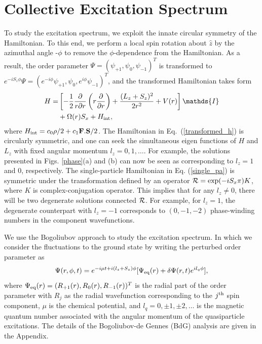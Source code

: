 \documentclass[pra,twocolumn,aps,superscriptaddress,showpacs,longbibliography]{revtex4-1}
\begin{document}
\section{Collective Excitation Spectrum}
\label{Sec-IV}
To study the excitation spectrum, we exploit the innate circular symmetry of the Hamiltonian. To this end, 
we perform a local spin rotation about $\hat{z}$ by the azimuthal angle -$\phi$ to remove the $\phi$-dependence from
the Hamiltonian. As a result, the order parameter $\Psi = (\psi_{+1}, \psi_0, \psi_{-1})^T$ is transformed to 
$e^{-i S_z\phi}{\Psi} =(e^{-i\phi}\psi_{+1}, \psi_0, e^{i\phi} \psi_{-1})^T$, and the transformed Hamiltonian
takes form
\begin{align}
\label{transformed_h}
{H} =& \left[-\frac{1}{2}\frac{\partial}{r \partial r}\left(r\frac{\partial}{\partial r}\right)+\frac{(L_z+S_z)^2}{2 r^2}+ V(r)\right]\mathds{I}\nonumber  \\ 
&+\Omega(r)S_x  + H_{\rm int},
\end{align}
where {${H}_{\rm int} = c_0\rho/2+
c_1{\bf {F}}.{\bf S}/2$}. The Hamiltonian in Eq.~(\ref{transformed_h}) is circularly symmetric, and one can seek
the simultaneous eigen functions of $H$ and $L_z$ with fixed angular momentum $l_z = 0, 1, \ldots$.
For example, the solutions presented in Figs. \ref{phase}(a) and (b) can now be seen as
corresponding to $l_z=1$ and $0$, respectively.  The single-particle Hamiltonian in  Eq. (\ref{single_pa}) is symmetric under the
transformation defined by an operator $ {\cal R} = \exp(-i S_x \pi)K$, where $K$ is complex-conjugation
operator. This implies that for any $l_z\ne 0$, there will be two degenerate solutions connected $\cal R$. For example,
for $l_z = 1$, the degenerate counterpart with $l_z = -1$ corresponds to $(0,-1,-2)$ phase-winding numbers in the component
wavefunctions.

We use the Bogoliubov approach to study the excitation spectrum. 
{
In which we consider the fluctuations to the ground state by writing the perturbed order parameter
as
\begin{equation}\label{pop}
    {\Psi}(r,\phi,t) = e^{-i\mu t +i(l_z+S_z)\phi} [\Psi_{\rm eq}(r) +\delta {\Psi}(r,t)e^{i l_q \phi}],
\end{equation}
where $\Psi_{\rm eq}(r)=(R_{+1}(r), R_{0}(r), R_{-1}(r))^{T}$ is the radial part of the order parameter with  $R_{j}$ as the radial wavefunction
corresponding to the $j^{\rm th}$ spin component, $\mu$ is the chemical potential, and $l_q = 0, \pm1, \pm2,\ldots$ is the magnetic quantum number
associated with the angular momentum of the quasiparticle excitations.}
The details of the Bogoliubov-de Gennes (BdG) analysis are given in the Appendix. 
\end{document}
